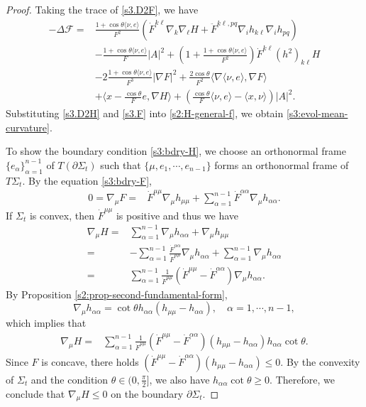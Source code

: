 \documentclass[11pt,reqno]{amsart}
\theoremstyle{definition}
\theoremstyle{remark}
\numberwithin{equation}{section}
\renewcommand{\(}{\left(}
\renewcommand{\)}{\right)}
\renewcommand{\-}{\overline}
\renewcommand{\a}{\alpha}
\renewcommand{\t}{\theta}
\begin{document}
\begin{proof}
Taking the trace of \eqref{s3.D2F}, we have
\begin{align}\label{s3.D2H}
 -\Delta \mathcal{F}  = & \frac{1+\cos\t\langle \nu,e\rangle}{F^2}\left(\dot{F}^{k\ell}\nabla_k \nabla_\ell H+\ddot{F}^{k\ell,pq}\nabla_i h_{k\ell}\nabla_i h_{pq}\right)\nonumber\\
 &-\frac{1+\cos\t\langle \nu,e\rangle}{F}|A|^2+\left(1+\frac{1+\cos\t\langle \nu,e\rangle}{F^2}\right)\dot{F}^{k\ell}(h^2)_{k\ell}H\nonumber\\
 &-2\frac{1+\cos\t\langle \nu,e\rangle}{F^3}|\nabla F|^2+\frac{2\cos\theta}{F^2}\langle \nabla\langle\nu,e\rangle, \nabla F\rangle \nonumber\\
  &+\langle x-\frac{\cos\theta}{F}e, \nabla H\rangle +\left(\frac{\cos\theta}{F}\langle \nu,e\rangle- \langle x,\nu\rangle\right)|A|^2.
\end{align}
Substituting \eqref{s3.D2H} and \eqref{s3.F} into \eqref{s2:H-general-f}, we obtain \eqref{s3:evol-mean-curvature}.

	To show the boundary condition \eqref{s3:bdry-H}, we choose an orthonormal frame $\{e_\alpha\}_{\alpha=1}^{n-1}$ of $T(\partial\Sigma_t)$ such that $\{\mu,e_1,\cdots,e_{n-1}\}$ forms an orthonormal frame of $T\Sigma_t$. By the equation \eqref{s3:bdry-F},
	\begin{align*}
	0=\nabla_\mu F=&\dot{F}^{\mu\mu}\nabla_\mu h_{\mu\mu}+\sum_{\a=1}^{n-1}\dot{F}^{\a\a}\nabla_\mu h_{\a\a}.
	\end{align*}
If $\Sigma_t$ is convex, then $\dot{F}^{\mu\mu}$ is positive and thus we have
\begin{align*}
\nabla_\mu H=&\sum_{\a=1}^{n-1}\nabla_\mu h_{\a\a}+\nabla_\mu h_{\mu\mu}\\
	=&-\sum_{\a=1}^{n-1}\frac{\dot{F}^{\a\a}}{\dot{F}^{\mu\mu}}\nabla_\mu h_{\a\a}+\sum_{\a=1}^{n-1} \nabla_\mu h_{\a\a}\\
	=&\sum_{\a=1}^{n-1} \frac{1}{\dot{F}^{\mu\mu}}(\dot{F}^{\mu\mu}-\dot{F}^{\a\a})\nabla_\mu h_{\a\a}.
\end{align*}
By Proposition \ref{s2:prop-second-fundamental-form},
$$
	\nabla_{\mu}h_{\a\a}=\cot\t {h}_{\a\a}(h_{\mu\mu}-h_{\a\a}), \quad \a=1,\cdots,n-1,
	$$
which implies that
	\begin{align*}
	\nabla_\mu H=&\sum_{\a=1}^{n-1} \frac{1}{\dot{F}^{\mu\mu}}(\dot{F}^{\mu\mu}-\dot{F}^{\a\a})(h_{\mu\mu}-h_{\a\a}){h}_{\a\a}\cot\theta.
	\end{align*}
Since $F$ is concave, there holds $(\dot{F}^{\mu\mu}-\dot{F}^{\a\a})(h_{\mu\mu}-h_{\a\a})\leq 0$. By the convexity of $\Sigma_t$ and the condition $\theta\in (0,\frac{\pi}2]$, we also have
${h}_{\a\a}\cot\theta\geq 0$. Therefore, we conclude that $\nabla_\mu H\leq 0$ on the boundary $\partial\Sigma_t$.


\end{proof}
\end{document}
